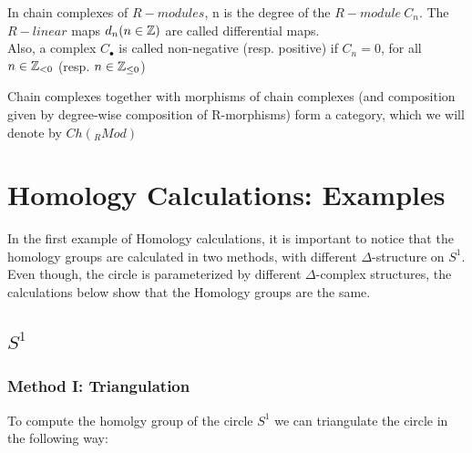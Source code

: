 \documentclass[11pt,a4paper]{report}
\begin{document}
        In chain complexes of $R-modules$, n is the degree of the $R-module \ C_n$. The $R-linear$ maps
        $d_n (n \in \mathbb{Z})$ are called differential maps. \\
        Also, a complex $C_\bullet$ is called non-negative (resp. positive) if $C_n = 0$, for all $n \in \mathbb{Z}_{<0}$ (resp. $n \in \mathbb{Z}_{\leq 0}$)

        Chain complexes together with morphisms of chain complexes (and composition given by
        degree-wise composition of R-morphisms) form a category, which we will denote by $Ch(_RMod)$

		 \section{Homology Calculations: Examples}\label{homology_ex}

		 In the first example of Homology calculations, it is important to notice that the homology groups are
		 calculated in two methods, with different $\Delta$-structure on $S^1$. Even though, the circle is
		 parameterized by different $\Delta$-complex structures, the calculations below show that the Homology groups are the same.
              \subsection{$ S^1$}
                \subsubsection{Method I: Triangulation}
                To compute the homolgy group of the circle $S^1$ we can triangulate the circle in the following way: \\
\end{document}
